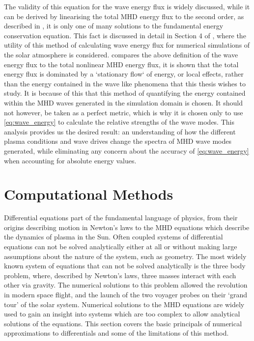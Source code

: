 The validity of this equation for the wave energy flux is widely discussed, while it can be derived by linearising the total MHD energy flux to the second order, as described in \cite{leroy1985}, it is only one of many solutions to the fundamental energy conservation equation.
This fact is discussed in detail in Section 4 of \cite{bogdan2003}, where the utility of this method of calculating wave energy flux for numerical simulations of the solar atmosphere is considered.
\cite{bogdan2003} compares the above definition of the wave energy flux to the total nonlinear MHD energy flux, it is shown that the total energy flux is dominated by a `stationary flow` of energy, or local effects, rather than the energy contained in the wave like phenomena that this thesis wishes to study.
It is because of this that this method of quantifying the energy contained within the MHD waves generated in the simulation domain is chosen.
It should not however, be taken as a perfect metric, which is why it is chosen only to use \cref{eq:wave_energy} to calculate the relative strengths of the wave modes.
This analysis provides us the desired result: an understanding of how the different plasma conditions and wave drives change the spectra of MHD wave modes generated, while eliminating any concern about the accuracy of \cref{eq:wave_energy} when accounting for absolute energy values.



\section{Computational Methods}\label{sec:numericalmethods}
Differential equations part of the fundamental language of physics, from their origins describing motion in Newton's laws to the MHD equations which describe the dynamics of plasma in the Sun. 
Often coupled systems of differential equations can not be solved analytically either at all or without making large assumptions about the nature of the system, such as geometry.
The most widely known system of equations that can not be solved analytically is the three body problem, where, described by Newton's laws, three masses interact with each other via gravity.
The numerical solutions to this problem allowed the revolution in modern space flight, and the launch of the two voyager probes on their `grand tour' of the solar system.
Numerical solutions to the MHD equations are widely used to gain an insight into systems which are too complex to allow analytical solutions of the equations.
This section covers the basic principals of numerical approximations to differentials and some of the limitations of this method.

